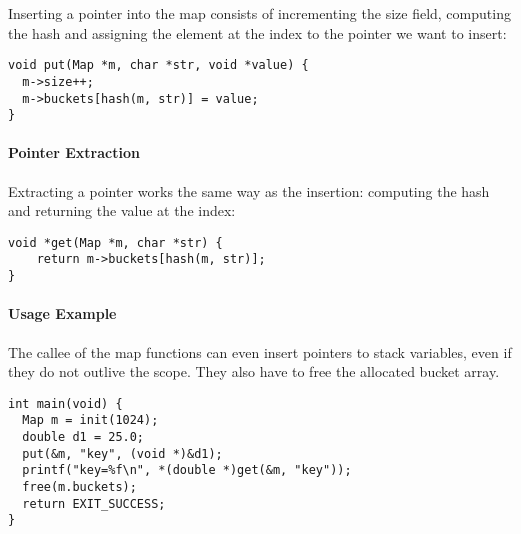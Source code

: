     Inserting a pointer into the map consists of incrementing the size field,
    computing the hash and assigning the element at the index to the pointer we
    want to insert:

    \begin{verbatim}
void put(Map *m, char *str, void *value) {
  m->size++;
  m->buckets[hash(m, str)] = value;
}
    \end{verbatim}

    \paragraph*{Pointer Extraction}
    Extracting a pointer works the same way as the insertion: computing the
    hash and returning the value at the index:


    \begin{verbatim}
void *get(Map *m, char *str) {
    return m->buckets[hash(m, str)]; 
}
    \end{verbatim}

    \paragraph*{Usage Example}

    The callee of the map functions can even insert pointers to stack
    variables, even if they do not outlive the scope. They also have
    to free the allocated bucket array.

    \begin{verbatim}
int main(void) {
  Map m = init(1024);
  double d1 = 25.0;
  put(&m, "key", (void *)&d1);
  printf("key=%f\n", *(double *)get(&m, "key"));
  free(m.buckets);
  return EXIT_SUCCESS;
}
    \end{verbatim}


